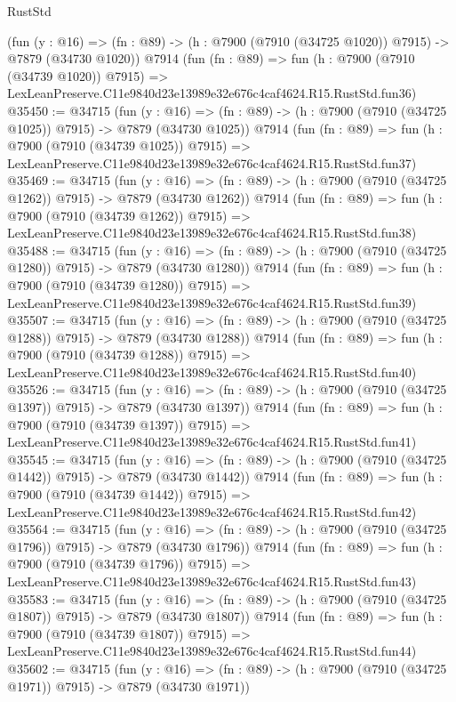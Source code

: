 \begin{lexlean}{RustStd}
\begin{coremodule}
    (fun (y : @16) =>
    (fn : @89) -> (h : @7900 (@7910 (@34725 @1020)) @7915) -> @7879 (@34730 @1020))
    @7914
    (fun (fn : @89) =>
    fun (h : @7900 (@7910 (@34739 @1020)) @7915) =>
    LexLeanPreserve.C11e9840d23e13989e32e676c4caf4624.R15.RustStd.fun36)
@35450 := @34715
    (fun (y : @16) =>
    (fn : @89) -> (h : @7900 (@7910 (@34725 @1025)) @7915) -> @7879 (@34730 @1025))
    @7914
    (fun (fn : @89) =>
    fun (h : @7900 (@7910 (@34739 @1025)) @7915) =>
    LexLeanPreserve.C11e9840d23e13989e32e676c4caf4624.R15.RustStd.fun37)
@35469 := @34715
    (fun (y : @16) =>
    (fn : @89) -> (h : @7900 (@7910 (@34725 @1262)) @7915) -> @7879 (@34730 @1262))
    @7914
    (fun (fn : @89) =>
    fun (h : @7900 (@7910 (@34739 @1262)) @7915) =>
    LexLeanPreserve.C11e9840d23e13989e32e676c4caf4624.R15.RustStd.fun38)
@35488 := @34715
    (fun (y : @16) =>
    (fn : @89) -> (h : @7900 (@7910 (@34725 @1280)) @7915) -> @7879 (@34730 @1280))
    @7914
    (fun (fn : @89) =>
    fun (h : @7900 (@7910 (@34739 @1280)) @7915) =>
    LexLeanPreserve.C11e9840d23e13989e32e676c4caf4624.R15.RustStd.fun39)
@35507 := @34715
    (fun (y : @16) =>
    (fn : @89) -> (h : @7900 (@7910 (@34725 @1288)) @7915) -> @7879 (@34730 @1288))
    @7914
    (fun (fn : @89) =>
    fun (h : @7900 (@7910 (@34739 @1288)) @7915) =>
    LexLeanPreserve.C11e9840d23e13989e32e676c4caf4624.R15.RustStd.fun40)
@35526 := @34715
    (fun (y : @16) =>
    (fn : @89) -> (h : @7900 (@7910 (@34725 @1397)) @7915) -> @7879 (@34730 @1397))
    @7914
    (fun (fn : @89) =>
    fun (h : @7900 (@7910 (@34739 @1397)) @7915) =>
    LexLeanPreserve.C11e9840d23e13989e32e676c4caf4624.R15.RustStd.fun41)
@35545 := @34715
    (fun (y : @16) =>
    (fn : @89) -> (h : @7900 (@7910 (@34725 @1442)) @7915) -> @7879 (@34730 @1442))
    @7914
    (fun (fn : @89) =>
    fun (h : @7900 (@7910 (@34739 @1442)) @7915) =>
    LexLeanPreserve.C11e9840d23e13989e32e676c4caf4624.R15.RustStd.fun42)
@35564 := @34715
    (fun (y : @16) =>
    (fn : @89) -> (h : @7900 (@7910 (@34725 @1796)) @7915) -> @7879 (@34730 @1796))
    @7914
    (fun (fn : @89) =>
    fun (h : @7900 (@7910 (@34739 @1796)) @7915) =>
    LexLeanPreserve.C11e9840d23e13989e32e676c4caf4624.R15.RustStd.fun43)
@35583 := @34715
    (fun (y : @16) =>
    (fn : @89) -> (h : @7900 (@7910 (@34725 @1807)) @7915) -> @7879 (@34730 @1807))
    @7914
    (fun (fn : @89) =>
    fun (h : @7900 (@7910 (@34739 @1807)) @7915) =>
    LexLeanPreserve.C11e9840d23e13989e32e676c4caf4624.R15.RustStd.fun44)
@35602 := @34715
    (fun (y : @16) =>
    (fn : @89) -> (h : @7900 (@7910 (@34725 @1971)) @7915) -> @7879 (@34730 @1971))

\end{coremodule}
\end{lexlean}
